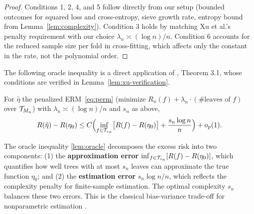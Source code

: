 \documentclass[12pt]{article}
\begin{document}
\begin{proof}
Conditions 1, 2, 4, and 5 follow directly from our setup (bounded outcomes for squared loss and cross-entropy, sieve growth rate, entropy bound from Lemma~\ref{lem:complexity}). Condition 3 holds by matching Xu et al.'s penalty requirement with our choice $\lambda_n \asymp (\log n)/n$. Condition 6 accounts for the reduced sample size per fold in cross-fitting, which affects only the constant in the rate, not the polynomial order.
\end{proof}

The following oracle inequality is a direct application of \citet{xuStatisticalOptimalityOptimal2026}, Theorem 3.1, whose conditions are verified in Lemma~\ref{lem:xu-verification}.

\begin{lemma}
\label{lem:oracle}
For $\hat\eta$ the penalized ERM~\eqref{eq:perm} (minimize $R_n(f) + \lambda_n \cdot (\#\text{leaves of } f)$ over $\mathcal{T}_{M_n}$) with $\lambda_n \asymp (\log n)/n$ and $s_n$ as above,
\[
R(\hat\eta) - R(\eta_0) \le C \Bigl( \inf_{f \in \mathcal{T}_{s_n}} \bigl[ R(f) - R(\eta_0) \bigr] + \frac{s_n \log n}{n} \Bigr) + o_p(1).
\]
\end{lemma}

\begin{remark}
The oracle inequality \eqref{lem:oracle} decomposes the excess risk into two components: (1) the \textbf{approximation error} $\inf_{f \in \mathcal{T}_{s_n}} [R(f) - R(\eta_0)]$, which quantifies how well trees with at most $s_n$ leaves can approximate the true function $\eta_0$; and (2) the \textbf{estimation error} $s_n \log n / n$, which reflects the complexity penalty for finite-sample estimation. The optimal complexity $s_n$ balances these two errors. This is the classical bias-variance trade-off for nonparametric estimation \citep{xuStatisticalOptimalityOptimal2026}.
\end{remark}
\end{document}
